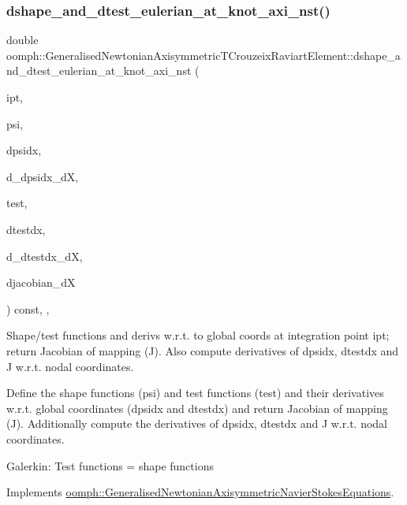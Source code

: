 \subsubsection{\texorpdfstring{dshape\+\_\+and\+\_\+dtest\+\_\+eulerian\+\_\+at\+\_\+knot\+\_\+axi\+\_\+nst()}{dshape\_and\_dtest\_eulerian\_at\_knot\_axi\_nst()}\hspace{0.1cm}{\footnotesize\ttfamily [2/2]}}
{\footnotesize\ttfamily double oomph\+::\+Generalised\+Newtonian\+Axisymmetric\+T\+Crouzeix\+Raviart\+Element\+::dshape\+\_\+and\+\_\+dtest\+\_\+eulerian\+\_\+at\+\_\+knot\+\_\+axi\+\_\+nst (\begin{DoxyParamCaption}\item[{const unsigned \&}]{ipt,  }\item[{\hyperlink{classoomph_1_1Shape}{Shape} \&}]{psi,  }\item[{\hyperlink{classoomph_1_1DShape}{D\+Shape} \&}]{dpsidx,  }\item[{\hyperlink{classoomph_1_1RankFourTensor}{Rank\+Four\+Tensor}$<$ double $>$ \&}]{d\+\_\+dpsidx\+\_\+dX,  }\item[{\hyperlink{classoomph_1_1Shape}{Shape} \&}]{test,  }\item[{\hyperlink{classoomph_1_1DShape}{D\+Shape} \&}]{dtestdx,  }\item[{\hyperlink{classoomph_1_1RankFourTensor}{Rank\+Four\+Tensor}$<$ double $>$ \&}]{d\+\_\+dtestdx\+\_\+dX,  }\item[{\hyperlink{classoomph_1_1DenseMatrix}{Dense\+Matrix}$<$ double $>$ \&}]{djacobian\+\_\+dX }\end{DoxyParamCaption}) const\hspace{0.3cm}{\ttfamily [inline]}, {\ttfamily [protected]}, {\ttfamily [virtual]}}



Shape/test functions and derivs w.\+r.\+t. to global coords at integration point ipt; return Jacobian of mapping (J). Also compute derivatives of dpsidx, dtestdx and J w.\+r.\+t. nodal coordinates. 

Define the shape functions (psi) and test functions (test) and their derivatives w.\+r.\+t. global coordinates (dpsidx and dtestdx) and return Jacobian of mapping (J). Additionally compute the derivatives of dpsidx, dtestdx and J w.\+r.\+t. nodal coordinates.

Galerkin\+: Test functions = shape functions 

Implements \hyperlink{classoomph_1_1GeneralisedNewtonianAxisymmetricNavierStokesEquations_a768856dbac816acd9b207ed6065bcae7}{oomph\+::\+Generalised\+Newtonian\+Axisymmetric\+Navier\+Stokes\+Equations}.



